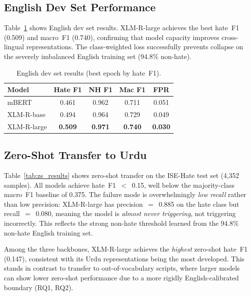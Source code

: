 \documentclass{article}
\begin{document}
\subsection{English Dev Set Performance}

Table~\ref{tab:en_results} shows English dev set results.
XLM-R-large achieves the best hate~F1 (0.509) and macro~F1 (0.740),
confirming that model capacity improves cross-lingual representations.
The class-weighted loss successfully prevents collapse on the severely
imbalanced English training set (94.8\% non-hate).

\begin{table}[h]
\centering
\caption{English dev set results (best epoch by hate~F1).}
\label{tab:en_results}
\vskip 0.05in
\begin{small}
\begin{tabular}{lcccc}
\toprule
Model & Hate F1 & NH F1 & Mac F1 & FPR \\
\midrule
mBERT          & 0.461 & 0.962 & 0.711 & 0.051 \\
XLM-R-base     & 0.494 & 0.964 & 0.729 & 0.049 \\
XLM-R-large    & \textbf{0.509} & \textbf{0.971} & \textbf{0.740} & \textbf{0.030} \\
\bottomrule
\end{tabular}
\end{small}
\end{table}

\subsection{Zero-Shot Transfer to Urdu}
\label{sec:zero-shot}

Table~\ref{tab:zs_results} shows zero-shot transfer on the ISE-Hate test
set (4{,}352 samples).
All models achieve hate~F1~$<$~0.15, well below the majority-class
macro~F1 baseline of 0.375.
The failure mode is overwhelmingly \emph{low recall} rather than low
precision: XLM-R-large has precision~$=$~0.885 on the hate class but
recall~$=$~0.080, meaning the model is \emph{almost never triggering},
not triggering incorrectly.
This reflects the strong non-hate threshold learned from the 94.8\%
non-hate English training set.

Among the three backbones, XLM-R-large achieves the \emph{highest}
zero-shot hate~F1 (0.147), consistent with its Urdu representations
being the most developed.
This stands in contrast to transfer to out-of-vocabulary scripts, where
larger models can show lower zero-shot performance due to a more
rigidly English-calibrated boundary (RQ1, RQ2).
\end{document}

